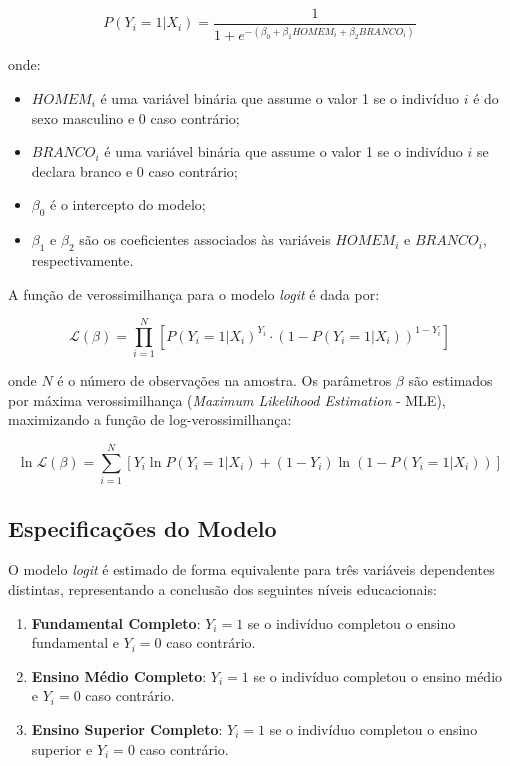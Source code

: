 \documentclass[a4paper,12pt]{article}
\begin{document}
\[
P(Y_i = 1 | X_i) = \frac{1}{1 + e^{-(\beta_0 + \beta_1 HOMEM_i + \beta_2 BRANCO_i)}}
\]

onde:
\begin{itemize}
    \item \( HOMEM_i \) é uma variável binária que assume o valor 1 se o indivíduo \( i \) é do sexo masculino e 0 caso contrário;
    \item \( BRANCO_i \) é uma variável binária que assume o valor 1 se o indivíduo \( i \) se declara branco e 0 caso contrário;
    \item \( \beta_0 \) é o intercepto do modelo;
    \item \( \beta_1 \) e \( \beta_2 \) são os coeficientes associados às variáveis \( HOMEM_i \) e \( BRANCO_i \), respectivamente.
\end{itemize}

A função de verossimilhança para o modelo \textit{logit} é dada por:

\[
\mathcal{L}(\beta) = \prod_{i=1}^N \left[ P(Y_i = 1 | X_i)^{Y_i} \cdot (1 - P(Y_i = 1 | X_i))^{1 - Y_i} \right]
\]

onde \( N \) é o número de observações na amostra. Os parâmetros \( \beta \) são estimados por máxima verossimilhança (\textit{Maximum Likelihood Estimation} - MLE), maximizando a função de log-verossimilhança:

\[
\ln \mathcal{L}(\beta) = \sum_{i=1}^N \left[ Y_i \ln P(Y_i = 1 | X_i) + (1 - Y_i) \ln (1 - P(Y_i = 1 | X_i)) \right]
\]

\subsection{Especificações do Modelo}

O modelo \textit{logit} é estimado de forma equivalente para três variáveis dependentes distintas, representando a conclusão dos seguintes níveis educacionais:
\begin{enumerate}
    \item \textbf{Fundamental Completo}: \( Y_i = 1 \) se o indivíduo completou o ensino fundamental e \( Y_i = 0 \) caso contrário.
    \item \textbf{Ensino Médio Completo}: \( Y_i = 1 \) se o indivíduo completou o ensino médio e \( Y_i = 0 \) caso contrário.
    \item \textbf{Ensino Superior Completo}: \( Y_i = 1 \) se o indivíduo completou o ensino superior e \( Y_i = 0 \) caso contrário.
\end{enumerate}
\end{document}
